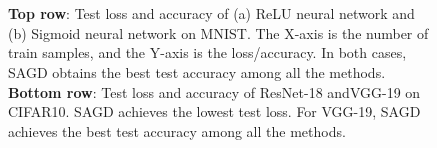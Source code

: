 \documentclass[11pt]{article}
\begin{document}
\begin{figure}[t]
\mbox{
\hspace{-0.1in}
 }


 \mbox{
\hspace{-0.1in}
 }
 \caption[]{ \textbf{Top row}: Test loss and accuracy of (a) ReLU neural network and (b) Sigmoid neural network on MNIST. The X-axis is the number of train samples, and the Y-axis is the loss/accuracy. In both cases, \textsc{SAGD} obtains the best test accuracy among all the methods.
\textbf{Bottom row}: Test loss and accuracy of ResNet-18 andVGG-19 on CIFAR10. \textsc{SAGD} achieves the lowest test loss. For VGG-19, \textsc{SAGD} achieves the best test accuracy among all the methods. } 
 \label{fig:mnist}
\end{figure}
\end{document}
